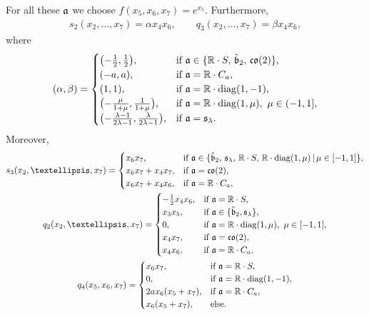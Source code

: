 \documentclass[11pt]{article}
\numberwithin{equation}{section}
\newcommand\fa{{\frak a}}
\newcommand\fb{{\frak b}}
\newcommand\fs{{\frak s}}
\newcommand{\fco}{\mathop{{\frak c \frak o}}}
\newcommand\RR{{\mathbb R}}
\newcommand{\diag}{\operatorname{diag}}
\begin{document}
For all these $\fa$ we choose $f(x_5,x_6,x_7) = e^{x_5}$. Furthermore, \begin{gather*}s_2(x_2,\dots, x_7)=\alpha x_4x_6,\qquad q_3(x_2,\dots, x_7)=\beta x_4x_6,\end{gather*} where
\begin{gather*} (\alpha,\beta) = \begin{cases}
\big({-}\tfrac12, \tfrac12\big), & \text{if } \fa\in \{\RR\cdot S,\, \hat \fb_2,\, \fco(2) \},\\
(-a,a),& \text{if } \fa=\RR\cdot C_a,\\
(1,1),& \text{if } \fa=\RR\cdot\diag(1,-1),\\
\big({-}\tfrac{\mu}{1+\mu}, \tfrac1{1+\mu}\big), & \text{if } \fa=\RR\cdot\diag(1,\mu),\ \mu\in(-1,1],\\
 \big({-}\tfrac{\lambda-1}{2\lambda -1}, \tfrac \lambda{2\lambda-1}\big), & \text{if } \fa=\fs_\lambda.\\
\end{cases}\end{gather*}
Moreover,
\begin{gather*}
 s_3 (x_2, \dots, x_7) = \begin{cases}
x_6x_7,& \text{if } \fa \in\{ \hat \fb_2,\, \fs_\lambda ,\, \RR\cdot S,\, \RR\cdot\diag(1,\mu) \,|\,\mu\in [-1,1] \}, \\
x_6x_7+x_4x_7,& \text{if } \fa =\fco(2) , \\
x_6x_7+x_4x_6,& \text{if } \fa =\RR\cdot C_a ,
\end{cases} \\
q_2 (x_2, \dots, x_7) = \begin{cases}
-\tfrac12 x_4x_6,& \text{if } \fa=\RR\cdot S, \\
x_3x_5,& \text{if } \fa \in\{\hat\fb_2,\fs_\lambda\} , \\
0,& \text{if } \fa =\RR\cdot \diag(1,\mu) , \ \mu\in[-1,1], \\
x_4x_7,& \text{if } \fa =\fco(2),\\
x_4x_6,& \text{if } \fa =\RR\cdot C_a,
\end{cases}\\
q_4(x_5,x_6, x_7)=\begin{cases}x_6x_7,& \text{if } \fa=\RR\cdot S,\\
0,& \text{if } \fa=\RR\cdot \diag(1,-1),\\
2ax_6(x_5+x_7) ,& \text{if } \fa=\RR\cdot C_a,\\
x_6(x_5+x_7),& \text{else.}
\end{cases}
\end{gather*}
\end{document}
